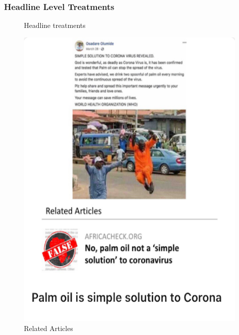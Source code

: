 \documentclass[letterpaper, 12pt, parskip=full,DIV=10]{scrartcl}
\begin{document}
\subsubsection{Headline Level Treatments}

\begin{figure}[htb]
\centering
    \caption{Headline treatments}
    \label{headline_treatments}
    \begin{minipage}{0.4\textwidth}
        \centering
        \includegraphics[width=\textwidth]{figures/treat_relatedarticles.png} 
        \caption*{Related Articles}
    \end{minipage}\hfill
    \begin{minipage}{0.4\textwidth}
        \centering

\end{minipage}
\end{figure}
\end{document}

